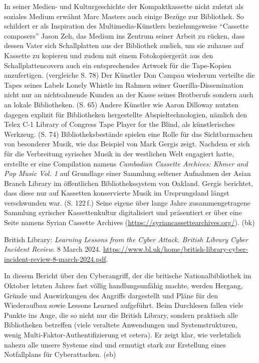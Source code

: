 \documentclass[a4paper,
fontsize=11pt,
oneside,
numbers=noperiodatend,
parskip=half-,
bibliography=totoc,
final
]{scrartcl}
\begin{document}
In seiner Medien- und Kulturgeschichte der Kompaktkassette nicht zuletzt
als soziales Medium erwähnt Marc Masters auch einige Bezüge zur
Bibliothek. So schildert er als Inspiration des Multimedia-Künstlers
beziehungsweise \enquote{Cassette composers} Jason Zeh, das Medium ins
Zentrum seiner Arbeit zu rücken, dass dessen Vater sich Schallplatten
aus der Bibliothek auslieh, um sie zuhause auf Kassette zu kopieren und
zudem mit einem Fotokopiergerät aus den Schallplattencovern auch ein
entsprechendes Artwork für die Tape-Kopien anzufertigen. (vergleiche S.
78) Der Künstler Don Campau wiederum verteilte die Tapes seines Labels
Lonely Whistle im Rahmen seiner Guerilla-Dissemination nicht nur an
nichtsahnende Kunden an der Kasse seines Brotberufs sondern auch an
lokale Bibliotheken. (S. 65) Andere Künstler wie Aaron Dilloway nutzten
dagegen explizit für Bibliotheken hergestellte Abspieltechnologien,
nämlich den Telex C-1 Library of Congress Tape Player for the Blind, als
künstlerisches Werkzeug. (S. 74) Bibliotheksbestände spielen eine Rolle
für das Sichtbarmachen von besonderer Musik, wie das Beispiel von Mark
Gergis zeigt. Nachdem er sich für die Verbreitung syrischer Musik in der
westlichen Welt engagiert hatte, erstellte er eine Compilation namens
\emph{Cambodian Cassette Archives: Khmer and Pop Music Vol. 1} auf
Grundlage einer Sammlung seltener Aufnahmen der Asian Branch Library im
öffentlichen Bibliothekssystem von Oakland. Gergis berichtet, dass diese
nur auf Kassetten konservierte Musik im Ursprungsland längst
verschwunden war. (S. 122\,f.) Seine eigene über lange Jahre
zusammengetragene Sammlung syrischer Kassettenkultur digitalisiert und
präsentiert er über eine Seite namens Syrian Cassette Archives
(\url{https://syriancassettearchives.org/}). (bk)

British Library: \emph{Learning Lessons from the Cyber Attack. British
Library Cyber Incident Review}. 8 March 2024.
\url{https://www.bl.uk/home/british-library-cyber-incident-review-8-march-2024.pdf}.

In diesem Bericht über den Cyberangriff, der die britische
Nationalbibliothek im Oktober letzten Jahres fast völlig
handlungsunfähig machte, werden Hergang, Gründe und Auswirkungen des
Angriffs dargestellt und Pläne für den Wiederaufbau sowie Lessons
Learned aufgeführt. Beim Durchlesen fallen viele Punkte ins Auge, die so
nicht nur die British Library, sondern praktisch alle Bibliotheken
betreffen (viele veraltete Anwendungen und Systemstrukturen, wenig
Multi-Faktor-Authentifizierung et cetera). Er zeigt klar, wie
verletzlich nahezu alle unsere Systeme sind und ermutigt stark zur
Erstellung eines Notfallplans für Cyberattacken. (eb)
\end{document}
